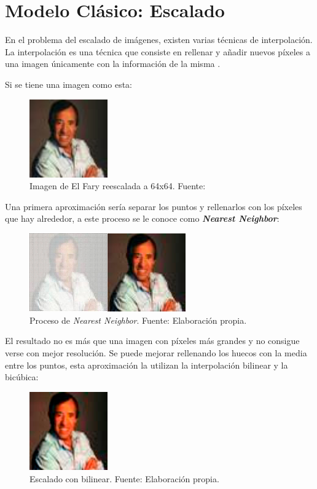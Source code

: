 \section{Modelo Clásico: Escalado}

\quad En el problema del escalado de imágenes, existen varias técnicas de interpolación. La interpolación es una técnica que consiste en rellenar y añadir nuevos píxeles a una imagen únicamente con la información de la misma \cite{matlabinterpolation}.

Si se tiene una imagen como esta:

\begin{figure}[H]
	\centering
	\includegraphics[width=0.3\textwidth]{figures/fary.jpg}
	\caption{\label{fig:fary}Imagen de El Fary reescalada a 64x64. Fuente: \cite{fary}}
\end{figure}

Una primera aproximación sería separar los puntos y rellenarlos con los píxeles que hay alrededor, a este proceso se le conoce como \textit{\textbf{Nearest Neighbor}}:

\begin{figure}[H]
	\centering
	\includegraphics[width=0.6\textwidth]{figures/fary_ampliada.png}
	\caption{\label{fig:farynearneighbour}Proceso de \textit{Nearest Neighbor}. Fuente: Elaboración propia.}
\end{figure}

El resultado no es más que una imagen con píxeles más grandes y no consigue verse con mejor resolución. Se puede mejorar rellenando los huecos con la media entre los puntos, esta aproximación la utilizan la interpolación bilinear y la bicúbica:

\begin{figure}[H]
	\centering
	\includegraphics[width=0.3\textwidth]{figures/fary_ampliada_bilinear.png}
	\caption{\label{fig:farybilinear}Escalado con bilinear. Fuente: Elaboración propia.}
\end{figure}


